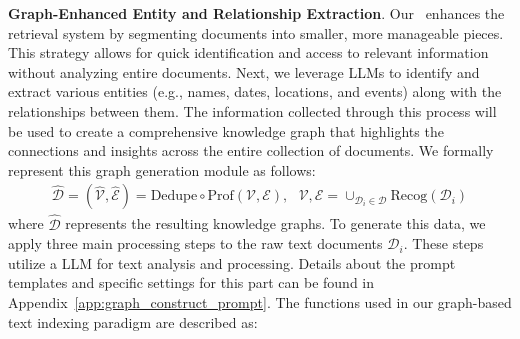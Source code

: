 \textbf{Graph-Enhanced Entity and Relationship Extraction}. Our \model\ enhances the retrieval system by segmenting documents into smaller, more manageable pieces. This strategy allows for quick identification and access to relevant information without analyzing entire documents. Next, we leverage LLMs to identify and extract various entities (e.g., names, dates, locations, and events) along with the relationships between them. The information collected through this process will be used to create a comprehensive knowledge graph that highlights the connections and insights across the entire collection of documents. We formally represent this graph generation module as follows:
\begin{align}
    \hat{\mathcal{D}} = (\hat{\mathcal{V}},\hat{\mathcal{E}}) = \text{Dedupe}\circ\text{Prof}(\mathcal{V}, \mathcal{E}),~~~\mathcal{V}, \mathcal{E} = \cup_{\mathcal{D}_i\in\mathcal{D}} \text{Recog}(\mathcal{D}_i)
\end{align}
where $\hat{\mathcal{D}}$ represents the resulting knowledge graphs. To generate this data, we apply three main processing steps to the raw text documents $\mathcal{D}_i$. These steps utilize a LLM for text analysis and processing. Details about the prompt templates and specific settings for this part can be found in Appendix~\ref{app:graph_construct_prompt}. The functions used in our graph-based text indexing paradigm are described as:

